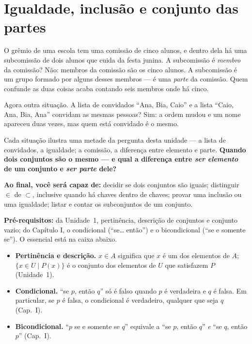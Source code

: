 \clearpage
\section{Igualdade, inclusão e conjunto das partes}

\Prefacio
\begin{prefacio}

O grêmio de uma escola tem uma comissão de cinco alunos, e dentro dela há uma subcomissão de dois alunos que cuida da festa junina. A subcomissão é \emph{membro} da comissão? Não: membros da comissão são os cinco alunos. A subcomissão é um grupo formado por alguns desses membros — é uma \emph{parte} da comissão. Quem confunde as duas coisas acaba contando seis membros onde há cinco.

Agora outra situação. A lista de convidados \enquote{Ana, Bia, Caio} e a lista \enquote{Caio, Ana, Bia, Ana} convidam as mesmas pessoas? Sim: a ordem mudou e um nome apareceu duas vezes, mas quem está convidado é o mesmo.

Cada situação ilustra uma metade da pergunta desta unidade — a lista de convidados, a igualdade; a comissão, a diferença entre elemento e parte. \textbf{Quando dois conjuntos são o mesmo — e qual a diferença entre \emph{ser elemento} de um conjunto e \emph{ser parte} dele?} 

\textbf{Ao final, você será capaz de:} decidir se dois conjuntos são iguais; distinguir $\in$ de $\subset$, inclusive quando há chaves dentro de chaves; provar uma inclusão ou uma igualdade; listar e contar os subconjuntos de um conjunto.

\textbf{Pré-requisitos:} da Unidade~1, pertinência, descrição de conjuntos e conjunto vazio; do Capítulo I, o condicional (\enquote{se\ldots{} então}) e o bicondicional (\enquote{se e somente se}). O essencial está na caixa abaixo.
\end{prefacio}

\begin{minimo}
\begin{itemize}[leftmargin=1.4em,itemsep=1pt]
  \item \textbf{Pertinência e descrição.} $x\in A$ significa que $x$ é um dos elementos de $A$; $\{x\in U\mid P(x)\}$ é o conjunto dos elementos de $U$ que satisfazem $P$ (Unidade~1).
  \item \textbf{Condicional.} \enquote{se $p$, então $q$} só é falso quando $p$ é verdadeira e $q$ é falsa. Em particular, se $p$ é falsa, o condicional é verdadeiro, qualquer que seja $q$ (Cap.~I).
  \item \textbf{Bicondicional.} \enquote{$p$ se e somente se $q$} equivale a \enquote{se $p$, então $q$} \emph{e} \enquote{se $q$, então $p$} (Cap.~I).
\end{itemize}
\end{minimo}

